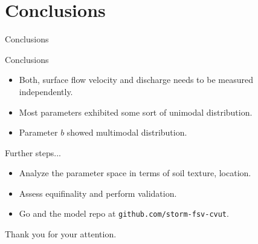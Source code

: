 \section{Conclusions}
\begin{frame}{Conclusions}
    \begin{block}{Conclusions}
        \begin{itemize}
          \item Both, surface flow velocity and discharge needs to be measured independently.
          \item Most parameters exhibited some sort of unimodal distribution.
          \item Parameter $b$ showed multimodal distribution. 
        \end{itemize}
    \end{block}
    \begin{block}{Further steps...}
        \begin{itemize}
          \item Analyze the parameter space in terms of soil texture, location. 
          \item Assess equifinality and perform validation.
          \item Go and the model repo at \texttt{github.com/storm-fsv-cvut}.
        \end{itemize}
    \end{block}
    \bigskip
    {\Large Thank you for your attention.}
\end{frame}
